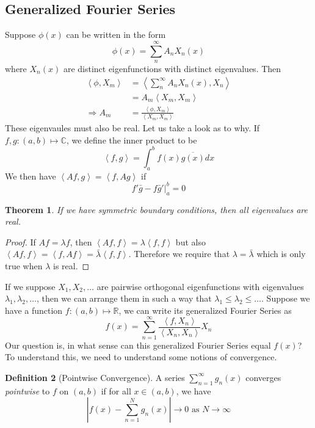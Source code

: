 \documentclass{article}
\newcommand{\R}{\mathbb{R}}
\newcommand{\ip}[2]{\left\langle #1,#2\right\rangle}
\newtheorem{theorem}{Theorem}[section]
\theoremstyle{definition}
\newtheorem{definition}[theorem]{Definition}
\begin{document}
\subsection{Generalized Fourier Series}
Suppose $\phi(x)$ can be written in the form 
\begin{equation*}
    \phi(x) = \sum^\infty_n A_n X_n(x)
\end{equation*}
where $X_n(x)$ are distinct eigenfunctions with distinct eigenvalues. Then 
\begin{equation*}
    \begin{split}
        \ip{\phi}{X_m} &= \ip{ \sum^\infty_n A_nX_n(x)}{X_n} \\
        &=A_m\ip{X_m}{X_m} \\
        \Rightarrow A_m&= \frac{\ip{\phi}{X_m}}{\ip{X_m}{X_m}}
    \end{split}
\end{equation*}
These eigenvaules must also be real. Let us take a look as to why. If $f,g:(a,b)\mapsto \mathbb{C}$, we define the inner product to be 
\begin{equation*}
    \ip{f}{g} =\int^b_af(x)\overline{g(x)}dx
\end{equation*}
We then have $\ip{Af}{g} =\ip{f}{Ag}$ if 
\begin{equation*}
    f'\bar g - f\bar g' \Big|^b_a=0
\end{equation*}
\begin{theorem}
    If we have symmetric boundary conditions, then all eigenvalues are real.
\end{theorem}
\begin{proof}
    If $Af=\lambda f$, then $\ip{Af}{f}=\lambda \ip{f}{f}$ but also $ \ip{Af}{f} =\ip{f}{Af}=\bar \lambda \ip{f}{f}$. Therefore we require that $\lambda =\bar \lambda$ which is only true when $\lambda $ is real.
\end{proof}
If we suppose $X_1,X_2,\ldots$ are pairwise orthogonal eigenfunctions with eigenvalues $\lambda_1,\lambda_2,\ldots$, then we can arrange them in such a way that $\lambda_1 \leq \lambda_2\leq \ldots$. Suppose we have a function $f:(a,b)\mapsto \R$, we can write its generalized Fourier Series as 
\begin{equation*}
    f(x) =\sum^\infty_{n=1} \frac{\ip{f}{X_n}}{\ip{X_n}{X_n}} X_n
\end{equation*}
Our question is, in what sense can this generalized Fourier Series equal $f(x)$? To understand this, we need to understand some notions of convergence.
\begin{definition}[Pointwise Convergence]
    A series $\displaystyle{\sum^\infty_{n=1}g_n(x)}$ converges \emph{pointwise} to $f$ on $(a,b)$ if for all $x\in (a,b)$, we have 
    \begin{equation*}
        \left| f(x)-\sum^N_{n=1}g_n(x) \right| \rightarrow 0 \text{ as } N\to \infty
    \end{equation*}
\end{definition}
\end{document}
